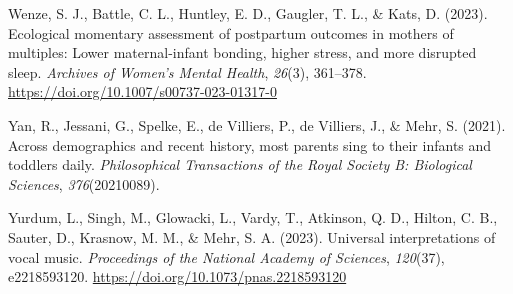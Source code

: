 \documentclass[
]{article}
\newlength{\cslhangindent}
\newenvironment{CSLReferences}[2] %
 {\begin{list}{}{%
  \setlength{\itemindent}{0pt}
  \setlength{\leftmargin}{0pt}
  \setlength{\parsep}{0pt}
  \ifodd #1
   \setlength{\leftmargin}{\cslhangindent}
   \setlength{\itemindent}{-1\cslhangindent}
  \fi
  \setlength{\itemsep}{#2\baselineskip}}}
 {\end{list}}
\begin{document}
\begin{CSLReferences}{1}{0}
Wenze, S. J., Battle, C. L., Huntley, E. D., Gaugler, T. L., \& Kats, D.
(2023). Ecological momentary assessment of postpartum outcomes in
mothers of multiples: {Lower} maternal-infant bonding, higher stress,
and more disrupted sleep. \emph{Archives of Women's Mental Health},
\emph{26}(3), 361--378. \url{https://doi.org/10.1007/s00737-023-01317-0}

Yan, R., Jessani, G., Spelke, E., de Villiers, P., de Villiers, J., \&
Mehr, S. (2021). Across demographics and recent history, most parents
sing to their infants and toddlers daily. \emph{Philosophical
Transactions of the Royal Society B: Biological Sciences},
\emph{376}(20210089).

Yurdum, L., Singh, M., Glowacki, L., Vardy, T., Atkinson, Q. D., Hilton,
C. B., Sauter, D., Krasnow, M. M., \& Mehr, S. A. (2023). Universal
interpretations of vocal music. \emph{Proceedings of the National
Academy of Sciences}, \emph{120}(37), e2218593120.
\url{https://doi.org/10.1073/pnas.2218593120}

\end{CSLReferences}
\end{document}
